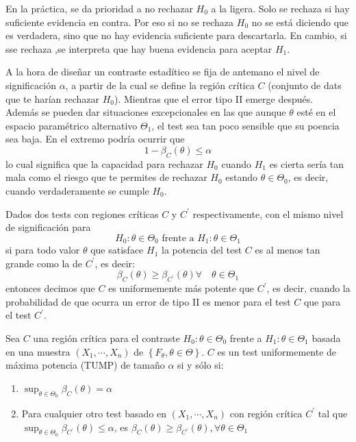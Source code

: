 \begin{observación}
    En la práctica, se da prioridad a no rechazar $H_0$ a la ligera. Solo se rechaza si hay suficiente evidencia en contra. Por eso si no se rechaza $H_0$ no se está diciendo que es verdadera, sino que no hay evidencia suficiente para descartarla. En cambio, si sse rechaza ,se interpreta que hay buena evidencia para aceptar $H_1$. 
\end{observación}

\begin{observación}
    A la hora de diseñar un contraste estadítico se fija de antemano el nivel de significación $\alpha$, a partir de la cual se define la región crítica $C$ (conjunto de dats que te harían rechazar $H_0$). Mientras que el error tipo II emerge después. \\
    Además se pueden dar situaciones excepcionales en las que aunque $\theta$ esté en el espacio paramétrico alternativo $\Theta_1$, el test sea tan poco sensible que su poencia sea baja. En el extremo podría ocurrir que
    $$1 - \beta_C(\theta) \leq \alpha$$
    lo cual significa que la capacidad para rechazar $H_0$ cuando $H_1$ es cierta sería tan mala como el riesgo que te permites de rechazar $H_0$ estando $\theta \in \Theta_0$, es decir, cuando verdaderamente se cumple $H_0$.
\end{observación}

\begin{definición}  
    Dados dos tests con regiones críticas $C$ y $C^{\prime}$ respectivamente, con el mismo nivel de significación para
    $$H_{0}: \theta \in \Theta_{0} \text{ frente a } H_{1}: \theta \in \Theta_{1}$$
    si para todo valor $\theta$ que satisface $H_1$ la potencia del test $C$ es al menos tan grande como la de $C^{\prime}$, es decir:
    $$\beta_{C}(\theta) \geq \beta_{C^{\prime}}(\theta) \forall \quad \theta \in \Theta_1$$  
    entonces decimos que $C$ es uniformemente más potente que $C^{\prime}$, es decir, cuando la probabilidad de que ocurra un error de tipo II es menor para el test $C$ que para el test $C^{\prime}$.
\end{definición}

\begin{definición} 
    Sea $C$ una región crítica para el contraste $H_0: \theta \in \Theta_0$ frente a $H_1: \theta \in \Theta_1$ basada en una muestra $\left(X_{1}, \cdots, X_{n}\right)$ de $\left\{F_{\theta}, \theta \in \Theta\right\}$. $C$ es un test uniformemente de máxima potencia (TUMP) de tamaño $\alpha$ si y sólo si: 
    \begin{enumerate}
        \item $\sup_{\theta \in \Theta_{0}} \beta_{C}(\theta)=\alpha$
        \item Para cualquier otro test basado en $\left(X_{1}, \cdots, X_{n}\right)$ con región crítica $C^{\prime}$ tal que $\sup_{\theta \in \Theta_{0}} \beta_{C^{\prime}}(\theta) \leq \alpha$, es $\beta_{C}(\theta) \geq \beta_{C^{\prime}}(\theta), \forall \theta \in \Theta_{1}$
    \end{enumerate}
\end{definición}


